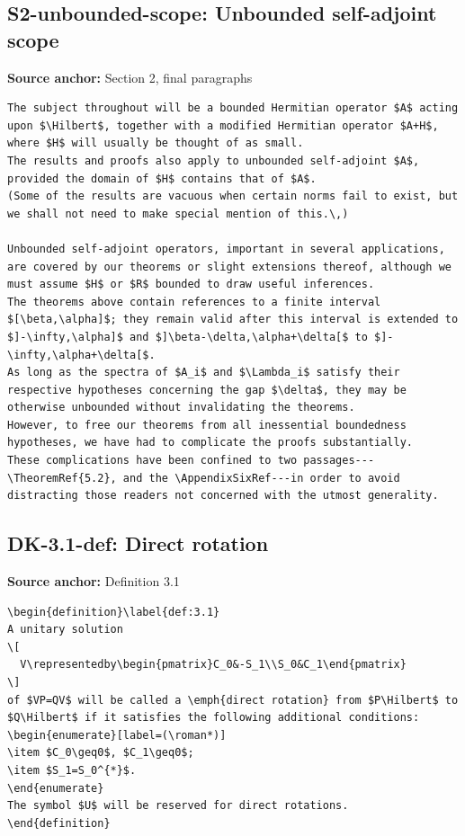 \subsection*{S2-unbounded-scope: Unbounded self-adjoint scope}
\noindent\textbf{Source anchor:} Section 2, final paragraphs\\
\begin{verbatim}
The subject throughout will be a bounded Hermitian operator $A$ acting upon $\Hilbert$, together with a modified Hermitian operator $A+H$, where $H$ will usually be thought of as small.
The results and proofs also apply to unbounded self-adjoint $A$, provided the domain of $H$ contains that of $A$.
(Some of the results are vacuous when certain norms fail to exist, but we shall not need to make special mention of this.\,)

Unbounded self-adjoint operators, important in several applications, are covered by our theorems or slight extensions thereof, although we must assume $H$ or $R$ bounded to draw useful inferences.
The theorems above contain references to a finite interval $[\beta,\alpha]$; they remain valid after this interval is extended to $]-\infty,\alpha]$ and $]\beta-\delta,\alpha+\delta[$ to $]-\infty,\alpha+\delta[$.
As long as the spectra of $A_i$ and $\Lambda_i$ satisfy their respective hypotheses concerning the gap $\delta$, they may be otherwise unbounded without invalidating the theorems.
However, to free our theorems from all inessential boundedness hypotheses, we have had to complicate the proofs substantially.
These complications have been confined to two passages---\TheoremRef{5.2}, and the \AppendixSixRef---in order to avoid distracting those readers not concerned with the utmost generality.
\end{verbatim}

\subsection*{DK-3.1-def: Direct rotation}
\noindent\textbf{Source anchor:} Definition 3.1\\
\begin{verbatim}
\begin{definition}\label{def:3.1}
A unitary solution
\[
  V\representedby\begin{pmatrix}C_0&-S_1\\S_0&C_1\end{pmatrix}
\]
of $VP=QV$ will be called a \emph{direct rotation} from $P\Hilbert$ to $Q\Hilbert$ if it satisfies the following additional conditions:
\begin{enumerate}[label=(\roman*)]
\item $C_0\geq0$, $C_1\geq0$;
\item $S_1=S_0^{*}$.
\end{enumerate}
The symbol $U$ will be reserved for direct rotations.
\end{definition}
\end{verbatim}

